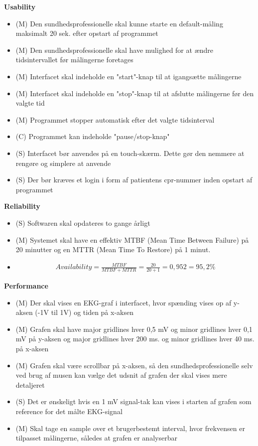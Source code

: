 \textbf{Usability}
\begin{itemize}
	\item (M) Den sundhedsprofessionelle skal kunne starte en default-måling maksimalt 20 sek. efter opstart af programmet
	\item (M) Den sundhedsprofessionelle skal have mulighed for at ændre tidsintervallet før målingerne foretages
	\item (M) Interfacet skal indeholde en "start"-knap til at igangsætte målingerne
	\item (M) Interfacet skal indeholde en "stop"-knap til at afslutte målingerne før den valgte tid
	\item (M) Programmet stopper automatisk efter det valgte tidsinterval
	\item (C) Programmet kan indeholde "pause/stop-knap"
	\item (S) Interfacet bør anvendes på en touch-skærm. Dette gør den nemmere at rengøre og simplere at anvende
	\item (S) Der bør kræves et login i form af patientens cpr-nummer inden opstart af programmet
\end{itemize}

\textbf{Reliability}
\begin{itemize}
	\item (S) Softwaren skal opdateres to gange årligt
	\item (M) Systemet skal have en effektiv MTBF (Mean Time Between Failure) på 20 minutter og en MTTR (Mean Time To Restore) på 1 minut.
	\item  
				\begin{align}
					Availability = \frac{MTBF}{MTBF+MTTR} = \frac{20}{20+1} = 0,952 = 95,2 \%
				\end{align}

\end{itemize}

\textbf{Performance}
\begin{itemize}
	\item (M) Der skal vises en EKG-graf i interfacet, hvor spænding vises op af y-aksen (-1V til 1V) og tiden på x-aksen
	\item (M) Grafen skal have major gridlines hver 0,5 mV og minor gridlines hver 0,1 mV på y-aksen og major gridlines hver 200 ms. og minor gridlines hver 40 ms. på x-aksen
	\item (M) Grafen skal være scrollbar på x-aksen, så den sundhedsprofessionelle selv ved brug af musen kan vælge det udsnit af grafen der skal vises mere detaljeret
	\item (S) Det er ønskeligt hvis en 1 mV signal-tak kan vises i starten af grafen som reference for det målte EKG-signal
	\item (M) Skal tage en sample over et brugerbestemt interval, hvor frekvensen  er tilpasset målingerne, således at grafen er analyserbar
\end{itemize}

